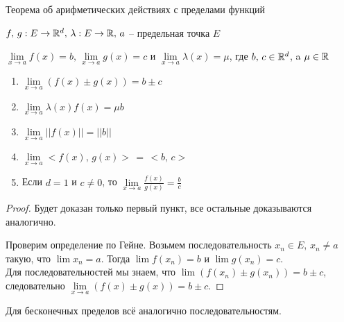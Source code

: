 \begin{theorem-non}
    Теорема об арифметических действиях с пределами функций

    $f, \, g : E \to \mathbb{R}^d, \, \lambda : E \to \mathbb{R}, \, a$ -- предельная точка $E$

    $\lim\limits_{x \to a} f(x) = b, \, \lim\limits_{x \to a} g(x) = c$ и $\lim\limits_{x \to a} \lambda(x) = \mu$, где $b, \, c \in \mathbb{R}^d$, a $\mu \in \mathbb{R}$
    \begin{enumerate}
        \item $\lim\limits_{x \to a} (f(x) \pm g(x)) = b \pm c$
        \item $\lim\limits_{x \to a} \lambda(x)f(x) = \mu b$
        \item $\lim\limits_{x \to a} ||f(x)|| = ||b||$
        \item $\lim\limits_{x \to a} <f(x), \, g(x)> \, = \, <b, \, c>$
        \item Если $d = 1$ и $c \neq 0$, то $\lim\limits_{x \to a} \frac{f(x)}{g(x)} = \frac{b}{c}$
    \end{enumerate}
\end{theorem-non}
\begin{proof}
    Будет доказан только первый пункт, все остальные доказываются аналогично.

    Проверим определение по Гейне. Возьмем последовательность $x_n \in E, \, x_n \neq a$ такую, что $\lim x_n = a$.
    Тогда $\lim f(x_n) = b$ и $\lim g(x_n) = c$. \\
    Для последовательностей мы знаем, что $\lim (f(x_n) \pm g(x_n)) = b \pm c$, следовательно $\lim\limits_{x \to a} (f(x) \pm g(x)) = b \pm c$.
\end{proof}
\begin{notice}
    Для бесконечных пределов всё аналогично последовательностям.
\end{notice}